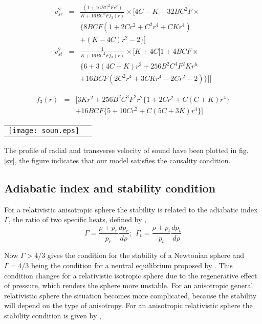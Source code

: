 \documentclass[preprintnumbers,amsmath,amssymb,floatfix,9pt,prd,twocolumn,
superscriptaddress,nofootinbib]{revtex4}
\begin{document}
\begin{eqnarray}
v_{sr}^{2} &=& \frac{(1+16 BC^2F r^2)}{K + 16 B C^2 F f_3(r)}\times\bigg[4C-K-32BC^{2}F\times \nonumber\\&&\Big\{8BCF(1+2Cr^{2}+C^{2}r^{4}+CKr^{4})\nonumber\\
&&+(K-4C)r^{2}-2\Big\}\bigg] \\
v_{st}^{2} &=& \frac{1}{K + 16 B C^2 F f_3(r)}\times \bigg[K + 4C\Big[1 + 4 B C F \times \nonumber\\
&&\Big\{6 + 3 (4 C + K) r^2 + 256 B^2 C^4 F^2 K r^6 \nonumber\\
&&+ 16 B C F (2C^2r^4 + 3C K r^4- 2 C r^2-2)\Big\}\Big]\bigg]
\end{eqnarray}

\begin{eqnarray*}
f_3(r)&=&[3 K r^2 +256 B^2 C^3 F^2 r^2 \{1 + 2 C r^2 + C(C + K) r^4\} \\
&&+16 B C F \{5 + 10 C r^2 + C (5 C + 3 K) r^4\}]
\end{eqnarray*}
\begin{figure*}[thbp]
\begin{center}
\begin{tabular}{rl}
\texttt{[image: soun.eps]}
\end{tabular}
\end{center}
\caption{Square of sound velocities is plotted against $r$ by employing the same values of the arbitrary constants as mentioned in fig. \ref{md}.}\label{sv}
\end{figure*}

The profile of radial and transverse velocity of sound have been plotted in fig. \ref{sv}, the figure indicates that our model satisfies the causality condition.

\subsection{Adiabatic index and stability condition}

For a relativistic anisotropic sphere the stability is related to the adiabatic index $\Gamma$, the ratio of two specific heats, defined by \cite{chan},
\begin{equation}
\Gamma=\frac{\rho+p_r}{p_r}\frac{dp_r}{d\rho}; ~~  \Gamma_t = \frac{\rho+p_t}{p_t}\frac{dp_t}{d\rho}
\end{equation}

Now $\Gamma>4/3$ gives the condition for the stability of a Newtonian sphere and $\Gamma =4/3$ being the condition for a neutral equilibrium proposed by \cite{bondi64}. This condition changes for a relativistic isotropic sphere due to the regenerative effect of pressure, which renders the sphere more unstable. For an anisotropic general relativistic sphere the situation becomes more complicated, because the stability will depend on the type of anisotropy. For an anisotropic relativistic sphere the stability condition is given by \cite{chan},
\end{document}
